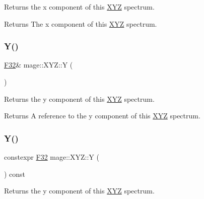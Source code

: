 Returns the x component of this \mbox{\hyperlink{structmage_1_1_x_y_z}{X\+YZ}} spectrum.

\begin{DoxyReturn}{Returns}
The x component of this \mbox{\hyperlink{structmage_1_1_x_y_z}{X\+YZ}} spectrum. 
\end{DoxyReturn}
\mbox{\label{structmage_1_1_x_y_z_a277aef6e7324279be52ece341116eb3c}} 
\subsubsection{\texorpdfstring{Y()}{Y()}\hspace{0.1cm}{\footnotesize\ttfamily [1/2]}}
{\footnotesize\ttfamily \mbox{\hyperlink{namespacemage_aa97e833b45f06d60a0a9c4fc22ae02c0}{F32}}\& mage\+::\+X\+Y\+Z\+::Y (\begin{DoxyParamCaption}{ }\end{DoxyParamCaption})\hspace{0.3cm}{\ttfamily [noexcept]}}

Returns the y component of this \mbox{\hyperlink{structmage_1_1_x_y_z}{X\+YZ}} spectrum.

\begin{DoxyReturn}{Returns}
A reference to the y component of this \mbox{\hyperlink{structmage_1_1_x_y_z}{X\+YZ}} spectrum. 
\end{DoxyReturn}
\mbox{\label{structmage_1_1_x_y_z_a9e182a271d824fc68487bb6c49b9235a}} 
\subsubsection{\texorpdfstring{Y()}{Y()}\hspace{0.1cm}{\footnotesize\ttfamily [2/2]}}
{\footnotesize\ttfamily constexpr \mbox{\hyperlink{namespacemage_aa97e833b45f06d60a0a9c4fc22ae02c0}{F32}} mage\+::\+X\+Y\+Z\+::Y (\begin{DoxyParamCaption}{ }\end{DoxyParamCaption}) const\hspace{0.3cm}{\ttfamily [noexcept]}}

Returns the y component of this \mbox{\hyperlink{structmage_1_1_x_y_z}{X\+YZ}} spectrum.

